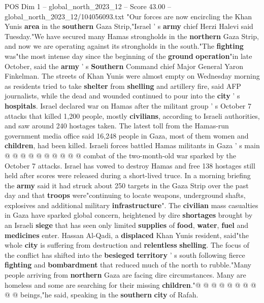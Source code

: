 \begin{textsample}{POS Dim 1 – global\_north\_2023\_12 – Score 43.00 – global\_north\_2023\_12/104056093.txt}  \label{ex:f1_pos_088}
"Our forces are now encircling the Khan Yunis \textbf{area} in the \textbf{southern} Gaza Strip,"Israel ' s \textbf{army} chief Herzi Halevi said Tuesday."We have secured many Hamas strongholds in the \textbf{northern} Gaza Strip, and now we are operating against its strongholds in the south."The \textbf{fighting} was"the most intense day since the beginning of the \textbf{ground} \textbf{operation}"in late October, said the \textbf{army} ' s \textbf{Southern} Command chief Major General Yaron Finkelman.
The streets of Khan Yunis were almost empty on Wednesday morning as residents tried to take \textbf{shelter} from \textbf{shelling} and artillery fire, said AFP journalists, while the dead and wounded continued to pour into the \textbf{city} ' s \textbf{hospitals}.
Israel declared war on Hamas after the militant group ' s October 7 attacks that killed 1,200 people, mostly \textbf{civilians}, according to Israeli authorities, and saw around 240 hostages taken.
The latest toll from the Hamas-run government media office said 16,248 people in Gaza, most of them women and \textbf{children}, had been killed.
Israeli forces battled Hamas militants in Gaza ' s main @ @ @ @ @ @ @ @ @ @ combat of the two-month-old war sparked by the October 7 attacks.
Israel has vowed to destroy Hamas and free 138 hostages still held after scores were released during a short-lived truce.
In a morning briefing the \textbf{army} said it had struck about 250 targets in the Gaza Strip over the past day and that \textbf{troops} were"continuing to locate weapons, underground shafts, explosives and additional military \textbf{infrastructure}".
The \textbf{civilian} mass casualties in Gaza have sparked global concern, heightened by dire \textbf{shortages} brought by an Israeli \textbf{siege} that has seen only limited \textbf{supplies} of \textbf{food}, \textbf{water}, \textbf{fuel} and \textbf{medicines} enter.
Hassan Al-Qadi, a \textbf{displaced} Khan Yunis resident, said"the whole \textbf{city} is suffering from destruction and \textbf{relentless} \textbf{shelling}.
The focus of the conflict has shifted into the \textbf{besieged} \textbf{territory} ' s south following fierce \textbf{fighting} and \textbf{bombardment} that reduced much of the north to rubble."Many people arriving from \textbf{northern} Gaza are facing dire circumstances.
Many are homeless and some are searching for their missing \textbf{children}."@ @ @ @ @ @ @ @ @ @ beings,"he said, speaking in the \textbf{southern} \textbf{city} of Rafah.

\end{textsample}
